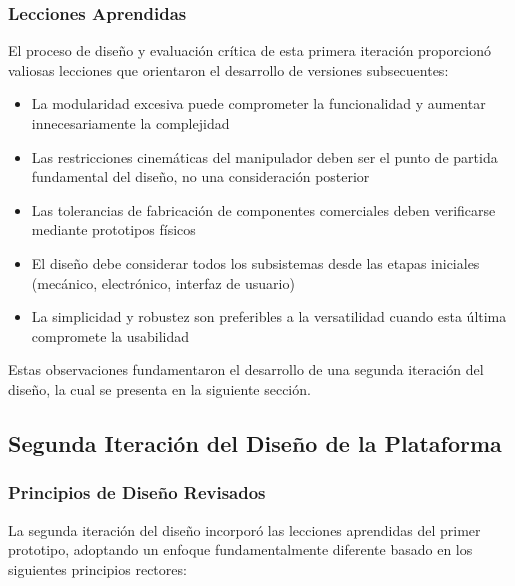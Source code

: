 \subsubsection{Lecciones Aprendidas}

El proceso de diseño y evaluación crítica de esta primera iteración proporcionó valiosas lecciones que orientaron el desarrollo de versiones subsecuentes:

\begin{itemize}
    \item La modularidad excesiva puede comprometer la funcionalidad y aumentar innecesariamente la complejidad
    \item Las restricciones cinemáticas del manipulador deben ser el punto de partida fundamental del diseño, no una consideración posterior
    \item Las tolerancias de fabricación de componentes comerciales deben verificarse mediante prototipos físicos
    \item El diseño debe considerar todos los subsistemas desde las etapas iniciales (mecánico, electrónico, interfaz de usuario)
    \item La simplicidad y robustez son preferibles a la versatilidad cuando esta última compromete la usabilidad
\end{itemize}

Estas observaciones fundamentaron el desarrollo de una segunda iteración del diseño, la cual se presenta en la siguiente sección.

\subsection{Segunda Iteración del Diseño de la Plataforma}

\subsubsection{Principios de Diseño Revisados}

La segunda iteración del diseño incorporó las lecciones aprendidas del primer prototipo, adoptando un enfoque fundamentalmente diferente basado en los siguientes principios rectores:

